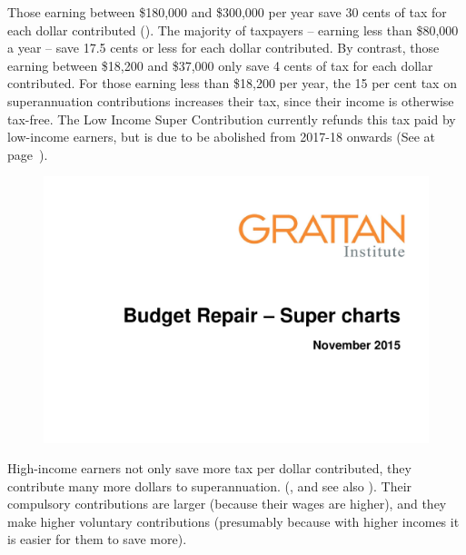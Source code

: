 Those earning between \$180,000 and \$300,000 per year save 30 cents of tax for each dollar contributed ().  The majority of taxpayers – earning less than \$80,000 a year – save 17.5 cents or less for each dollar contributed. By contrast, those earning between \$18,200 and \$37,000 only save 4 cents of tax for each dollar contributed.  For those earning less than \$18,200 per year, the 15 per cent tax on superannuation contributions increases their tax, since their income is otherwise tax-free. The Low Income Super Contribution currently refunds this tax paid by low-income earners, but is due to be abolished from 2017-18 onwards (See  at page~\pageref{sec:SUPER-LISC-to-be-abolished}).

\begin{figure}
\label{fig:SUPER-4-2}
\includegraphics[width=\columnwidth,page=20]{super-atlas/PPTX.pdf}

\end{figure}

High-income earners not only save more tax per dollar contributed, they contribute many more dollars to superannuation. (, and see also ). Their compulsory contributions are larger (because their wages are higher), and they make higher voluntary contributions (presumably because with higher incomes it is easier for them to save more). 


